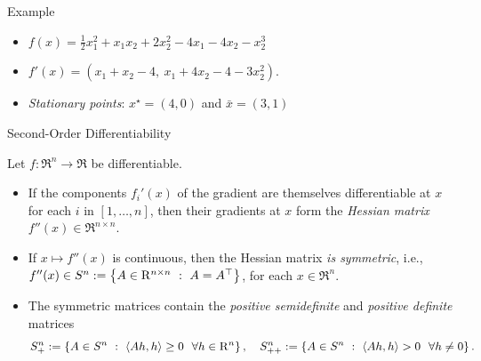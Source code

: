\documentclass[9pt]{beamer}
\begin{document}
\begin{frame}{Example}

  \begin{itemize}
    \setlength\itemsep{2.5em}
  \item $f(x) =\frac{1}{2} x_1^2 +x_1 x_2 +2 x_2^2 -4x_1-4 x_2-x_2^3$\\
  \item $f'(x)= (x_1+x_2-4,~x_1+4x_2-4-3x_2^2)$. \\
  \item \emph{Stationary points}: $x^\star=(4,0)$ and $\bar{x}=(3,1)$
  \end{itemize}
\end{frame}

\begin{frame}{Second-Order Differentiability}

  Let $f:\Re^n\to\Re$ be differentiable.
  \begin{itemize}
    \setlength\itemsep{1em}
  \item If the components $f_i'(x)$ of the gradient are themselves differentiable at $x$ for each $i$ in $[1, \dots, n]$, then their gradients at $x$ form the \emph{Hessian matrix} $f''(x) \in \Re^{n\times n}$.
  \item If $x\mapsto f''(x)$ is continuous, then the Hessian matrix \emph{is symmetric}, i.e., $f''(x)\in S^n := \left\{ A\in\mathrm{R}^{n\times n}\ : \ A=A^\top \right\}$, for each $x\in \Re^n$.
  \item The symmetric matrices contain the \emph{positive semidefinite} and \emph{positive definite} matrices
    \[
      S^n_{+} := \left\{ A\in S^n\ : \ \left<Ah, h\right>\geq 0 ~~\forall h\in\mathrm{R}^n \right\}, \quad S^n_{++} := \left\{ A\in S^n\ : \ \left<Ah, h\right>> 0 ~~\forall h\neq 0 \right\}.
    \]
  \end{itemize}

\end{frame}
\end{document}
